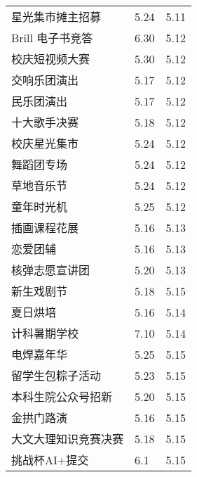 \documentclass[letterpaper, 12pt]{article}
\begin{document}
\begin{multicols}{2}
{\begin{longtable}{|>{\centering\arraybackslash}m{}|m{}|m{}|}
    星光集市摊主招募 & 5.24 & 5.11\\
    Brill 电子书竞答 & 6.30 & 5.12\\
    校庆短视频大赛 & 5.30 & 5.12\\
    交响乐团演出 & 5.17 & 5.12\\
    民乐团演出 & 5.17 & 5.12\\
    十大歌手决赛 & 5.18 & 5.12\\
    校庆星光集市 & 5.24 & 5.12\\
    舞蹈团专场 & 5.24 & 5.12\\
    草地音乐节 & 5.24 & 5.12\\
    童年时光机 & 5.25 & 5.12\\
    插画课程花展 & 5.16 & 5.13\\
    恋爱团辅 & 5.16 & 5.13\\
    核弹志愿宣讲团 & 5.20 & 5.13\\
    新生戏剧节 & 5.18 & 5.15\\
    夏日烘培 & 5.16 & 5.14\\
    计科暑期学校 & 7.10 & 5.14\\
    电焊嘉年华 & 5.25 & 5.15\\
    留学生包粽子活动 & 5.23 & 5.15\\
    本科生院公众号招新 & 5.20 & 5.15\\
    金拱门路演 & 5.16 & 5.15\\
    大文大理知识竞赛决赛 & 5.18 & 5.15\\
    挑战杯AI+提交 & 6.1 & 5.15\\
    \hline
\end{longtable}
\unskip
\unpenalty
\unpenalty}\unvbox\colbbox
\end{multicols}
\end{document}
